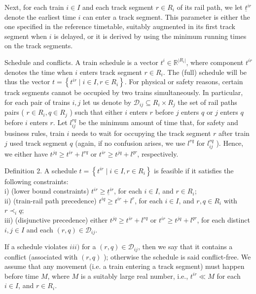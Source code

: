 \documentclass[10pt]{article}
\begin{document}
Next, for each train $i \in I$ and each track segment $r \in R_{i}$ of its rail path, we let $\underline{t}^{i r}$ denote the earliest time $i$ can enter a track segment. This parameter is either the one specified in the reference timetable, suitably augmented in its first track segment when $i$ is delayed, or it is derived by using the minimum running times on the track segments.

Schedule and conflicts. A train schedule is a vector $t^{i} \in \mathbb{R}^{\left|R_{i}\right|}$, where component $t^{i r}$ denotes the time when $i$ enters track segment $r \in R_{i}$. The (full) schedule will be thus the vector $t=\left\{t^{i r} \mid i \in I, r \in R_{i}\right\}$. For physical or safety reasons, certain track segments cannot be occupied by two trains simultaneously. In particular, for each pair of trains $i, j$ let us denote by $\mathcal{D}_{i j} \subseteq R_{i} \times R_{j}$ the set of rail paths pairs ( $r \in R_{i}, q \in R_{j}$ ) such that either $i$ enters $r$ before $j$ enters $q$ or $j$ enters $q$ before $i$ enters $r$. Let $l_{i j}^{r q}$ be the minimum amount of time that, for safety and business rules, train $i$ needs to wait for occupying the track segment $r$ after train $j$ used track segment $q$ (again, if no confusion arises, we use $l^{r q}$ for $l_{i j}^{r q}$ ). Hence, we either have $t^{j q} \geq t^{i r}+l^{r q}$ or $t^{i r} \geq t^{j q}+l^{q r}$, respectively.

Definition 2. A schedule $t=\left\{t^{i r} \mid i \in I, r \in R_{i}\right\}$ is feasible if it satisfies the following constraints:\\
i) (lower bound constraints) $t^{i r} \geq \underline{t}^{i r}$, for each $i \in I$, and $r \in R_{i}$;\\
ii) (train-rail path precedence) $t^{i q} \geq t^{i r}+l^{r}$, for each $i \in I$, and $r, q \in R_{i}$ with $r \prec_{i} q$;\\
iii) (disjunctive precedence) either $t^{j q} \geq t^{i r}+l^{r q}$ or $t^{i r} \geq t^{j q}+l^{q r}$, for each distinct $i, j \in I$ and each $(r, q) \in \mathcal{D}_{i j}$.

If a schedule violates $i i i)$ for a $(r, q) \in \mathcal{D}_{i j}$, then we say that it contains a conflict (associated with $(r, q)$ ); otherwise the schedule is said conflict-free. We assume that any movement (i.e. a train entering a track segment) must happen before time $M$, where $M$ is a suitably large real number, i.e., $t^{i r} \ll M$ for each $i \in I$, and $r \in R_{i}$.
\end{document}
